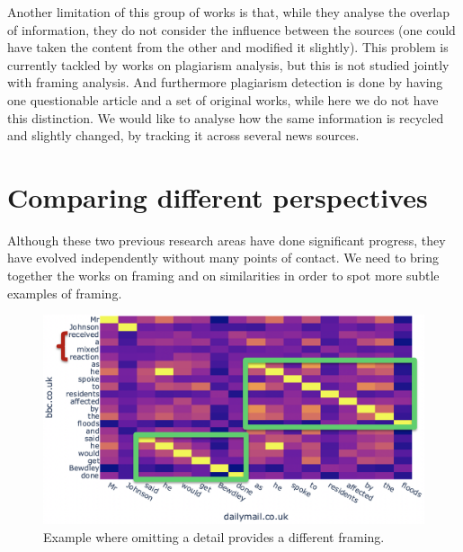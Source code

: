 Another limitation of this group of works is that, while they analyse the overlap of information, they do not consider the influence between the sources (one could have taken the content from the other and modified it slightly).
This problem is currently tackled by works on plagiarism analysis, but this is not studied jointly with framing analysis.
And furthermore plagiarism detection is done by having one questionable article and a set of original works, while here we do not have this distinction.
We would like to analyse how the same information is recycled and slightly changed, by tracking it across several news sources.




\section{Comparing different perspectives}
\label{sec:lit_gap}
Although these two previous research areas have done significant progress, they have evolved independently without many points of contact.
We need to bring together the works on framing and on similarities in order to spot more subtle examples of framing.

\begin{figure}[!htb]
    \centering
    \includegraphics[width=\linewidth]{figures/johnson_flood.png}
    \caption{Example where omitting a detail provides a different framing.}
    \label{fig:johnson_flood}
\end{figure}

